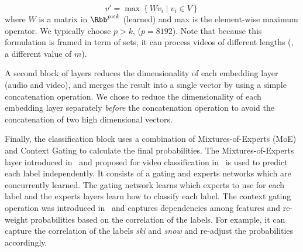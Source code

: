 \begin{equation}
  v' = \max \left\{Wv_{i}\mid v_i \in V \right\}
\end{equation}
where $W$ is a matrix in $\Rbb^{p \times k}$ (learned) and max is the element-wise maximum operator.
We typically choose $p > k$, (\eg $p = 8192$).
Note that because this formulation is framed in term of sets, it can process videos of different lengths (\ie, a different value of $m$).

A second block of layers reduces the dimensionality of each embedding layer (audio and video), and merges the result into a single vector by using a simple concatenation operation.
We chose to reduce the dimensionality of each embedding layer separately \emph{before} the concatenation operation to avoid the concatenation of two high dimensional vectors.

Finally, the classification block uses a combination of Mixtures-of-Experts (MoE) and Context Gating to calculate the final probabilities.
The Mixtures-of-Experts layer introduced in~\cite{716791} and proposed for video classification in~\cite{abu2016youtube} is used to predict each label independently.
It consists of a gating and experts networks which are concurrently learned.
The gating network learns which experts to use for each label and the experts layers learn how to classify each label.
The context gating operation was introduced in~\cite{miech2017learnable} and captures dependencies among features and re-weight probabilities based on the correlation of the labels.
For example, it can capture the correlation of the labels \emph{ski} and \emph{snow} and re-adjust the probabilities accordingly. 

